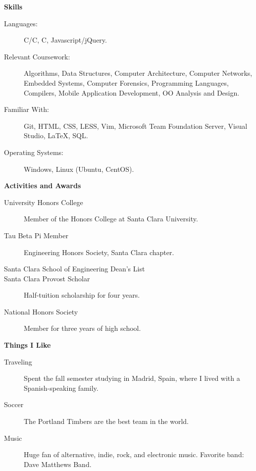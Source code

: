 \documentclass[letterpaper,11pt]{article}
\newcommand{\resheading}[1]{{\large \colorbox{mygrey}{\begin{minipage}{\textwidth}{\textbf{#1 \vphantom{p\^{E}}}}\end{minipage}}}}
\newcommand{\CC}{C\nolinebreak\hspace{-.05em}\raisebox{.4ex}{\tiny\bf +}\nolinebreak\hspace{-.10em}\raisebox{.4ex}{\tiny\bf +}}
\newcommand{\CS}{C\nolinebreak\hspace{-.05em}\raisebox{.4ex}{\scriptsize\bf \#}}
\begin{document}
\resheading{Skills}

\begin{description}
\item[Languages:]
C/\CC, \CS, Javascript/jQuery.
\item[Relevant Coursework:]
Algorithms, Data Structures, Computer Architecture, Computer Networks, Embedded Systems, Computer Forensics, Programming Languages, Compilers, Mobile Application Development, OO Analysis and Design. 
\item[Familiar With:]
Git, HTML, CSS, LESS, Vim, Microsoft Team Foundation Server, Visual Studio, \LaTeX, SQL.
\item[Operating Systems:]
Windows, Linux (Ubuntu, CentOS).
\end{description}

\resheading{Activities and Awards}

\begin{description}
\item[University Honors College]
Member of the Honors College at Santa Clara University.
\item[Tau Beta Pi Member]
Engineering Honors Society, Santa Clara chapter.
\item[Santa Clara School of Engineering Dean's List]
\item[Santa Clara Provost Scholar]
Half-tuition scholarship for four years.
\item[National Honors Society]
Member for three years of high school.
\end{description}

\resheading{Things I Like}

\begin{description}
\item[Traveling] Spent the fall semester studying in Madrid, Spain, where I lived with a Spanish-speaking family.
\item[Soccer] The Portland Timbers are the best team in the world.
\item[Music] Huge fan of alternative, indie, rock, and electronic music. Favorite band: Dave Matthews Band.
\end{description}
\end{document}

